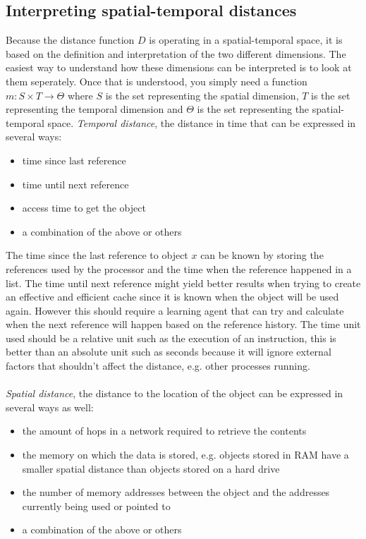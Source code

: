 \documentclass[pdftex,a4paper,12pt,twoside]{report}
\begin{document}
\subsection{Interpreting spatial-temporal distances}
Because the distance function $D$ is operating in a spatial-temporal space, it is based on the definition and interpretation of the two different dimensions.
The easiest way to understand how these dimensions can be interpreted is to look at them seperately. Once that is understood, you simply need a function 
$m : S \times T \to \Theta$ where $S$ is the set representing the spatial dimension, $T$ is the set representing the temporal dimension and $\Theta$ is the set representing the spatial-temporal space.
\newpage
\emph{Temporal distance}, the distance in time that can be expressed in several ways:
\begin{itemize}
\item time since last reference
\item time until next reference
\item access time to get the object
\item a combination of the above or others
\end{itemize}
The time since the last reference to object $x$ can be known by storing the references used by the processor and the time when the reference happened in a list. The time until next reference might yield better results when trying to create an effective and efficient cache since it is known when the object will be used again. However this should require a learning agent that can try and calculate when the next reference will happen based on the reference history. The time unit used should be a relative unit such as the execution of an instruction, this is better than an absolute unit such as seconds because it will ignore external factors that shouldn't affect the distance, e.g. other processes running.
\\\\
\emph{Spatial distance}, the distance to the location of the object can be expressed in several ways as well:
\begin{itemize}
\item the amount of hops in a network required to retrieve the contents
\item the memory on which the data is stored, e.g. objects stored in RAM have a smaller spatial distance than objects stored on a hard drive
\item the number of memory addresses between the object and the addresses currently being used or pointed to
\item a combination of the above or others
\end{itemize}
\end{document}
